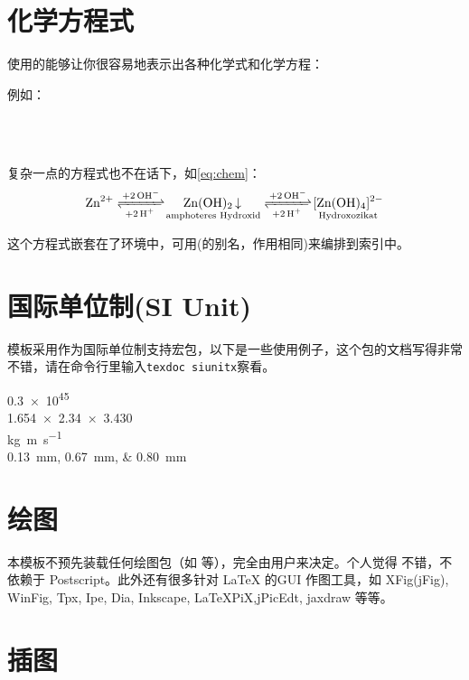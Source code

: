 \section{化学方程式}

使用的能够让你很容易地表示出各种化学式和化学方程：

例如：
\begin{center}
	\\ \\ 
\end{center}

复杂一点的方程式也不在话下，如\eqref{eq:chem}：
\begin{equation}\label{eq:chem}
	\ce{Zn^2+
		<=>[+ 2OH-][+ 2H+]
		$\underset{\text{amphoteres Hydroxid}}{\ce{Zn(OH)2 v}}$ <=>[+ 2OH-][+ 2H+]
		$\underset{\text{Hydroxozikat}}{\ce{[Zn(OH)4]^2-}}$
	}
\end{equation}

这个方程式嵌套在了环境中，可用(的别名，作用相同)来编排到索引中。


\section{国际单位制(SI Unit)}

模板采用作为国际单位制支持宏包，以下是一些使用例子，这个包的文档写得非常不错，请在命令行里输入\texttt{texdoc siunitx}察看。
\begin{center}
	\num{.3e45}\\
	\num{1.654 x 2.34 x 3.430}\\
	\si{\kilogram\metre\per\second}\\    
	\SIlist{0.13;0.67;0.80}{\milli\metre}
\end{center}


\section{绘图}
\label{sec:draw}

本模板不预先装载任何绘图包（如  等），完全由用户来决定。个人觉得  不错，不依赖于 Postscript。此外还有很多针对 \LaTeX{} 的GUI 作图工具，如 XFig(jFig), WinFig, Tpx, Ipe, Dia, Inkscape, LaTeXPiX,jPicEdt, jaxdraw 等等。

\section{插图}
\label{sec:graphs}

